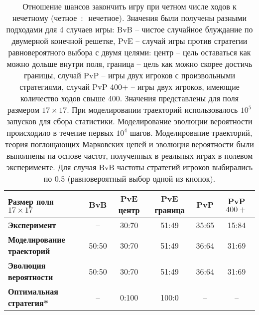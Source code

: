 \begin{table}[]
    \fontsize{10pt}{10pt}\selectfont
    \begin{tabular}{|l|c|c|c|c|c|}%
        \toprule
        Размер поля $17 \times 17$ & \textbf{BvB} & \textbf{PvE центр} & \textbf{PvE граница} & \textbf{PvP} & \textbf{PvP $400+$} \\
        \midrule
        \textbf{Эксперимент} & --     & 30:70 & 51:49 & 35:65 & 15:84 \\
        \textbf{Моделирование траекторий} & 50:50 & 30:70 & 51:49 & 36:64 & 31:69 \\
        \textbf{Эволюция вероятности}  & 50:50 & 30:70 & 51:49 & 36:64 & 31:69 \\
        \textbf{Оптимальная стратегия*}    & --     & 0:100 & 100:0 & --   & --     \\
        \bottomrule
    \end{tabular}
    \caption{
        Отношение шансов закончить игру при четном числе ходов к нечетному (четное~$:$~нечетное). 
        Значения были получены разными подходами для 4 случаев игры: 
        BvB -- чистое случайное блуждание по двумерной конечной решетке, 
        PvE -- случай игры против стратегии равновероятного выбора с двумя целями: центр -- цель оставаться как можно дольше внутри поля, 
        граница -- цель как можно скорее достичь границы, случай PvP -- игры двух игроков с произвольными стратегиями,
        случай PvP 400+ -- игры двух игроков, имеющие количество ходов свыше 400.
        Значения представлены для поля размером $17 \times 17$. При моделировании траекторий использовалось $10^5$ запусков для сбора статистики.
        Моделирование эволюции вероятности происходило в течение первых $10^4$ шагов. 
        Моделирование траекторий, теория поглощающих Марковских цепей и эволюция вероятности были выполнены на основе частот,
        полученных в реальных играх в полевом эксперименте. Для случая BvB частоты стратегий игроков выбирались по $0.5$ (равновероятный выбор одной из кнопок).
    }
    \label{tab:parity}
\end{table}

